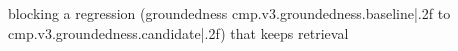 blocking a regression (groundedness {{cmp.v3.groundedness.baseline|.2f}} to {{cmp.v3.groundedness.candidate|.2f}}) that keeps retrieval
